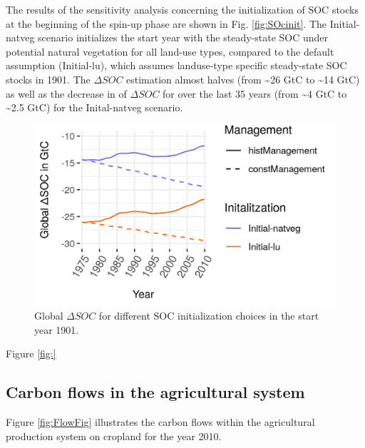 \documentclass[gc, manuscript]{copernicus}
\begin{document}
The results of the sensitivity analysis concerning the initialization of SOC stocks at the beginning of the spin-up phase are shown in Fig. \ref{fig:SOcinit}. The Initial-natveg scenario initializes the start year with the steady-state SOC under potential natural vegetation for all land-use types, compared to the default assumption (Initial-lu), which assumes landuse-type specific steady-state SOC stocks in 1901. The \(\Delta SOC\) estimation almost halves (from \textasciitilde26 GtC to \textasciitilde14 GtC) as well as the decrease in of \(\Delta SOC\) for over the last 35 years (from \textasciitilde4 GtC to \textasciitilde2.5 GtC) for the Inital-natveg scenario.

\begin{figure}[H]
\includegraphics[width=18cm]{../ResultNotebooks/Output/Images/scenario_init} \caption{Global $\Delta SOC$ for different SOC initialization choices in the start year 1901.}\label{fig:SOCinit}
\end{figure}

Figure \ref{fig:}

\hypertarget{carbon-flows-in-the-agricultural-system}{%
\subsection{Carbon flows in the agricultural system}\label{carbon-flows-in-the-agricultural-system}}

Figure \ref{fig:FlowFig} illustrates the carbon flows within the agricultural production system on cropland for the year 2010.
\end{document}
